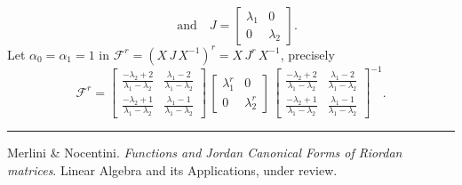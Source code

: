 \documentclass[9pt]{beamer}
\begin{document}
\begin{frame}[fragile]
\begin{displaymath}
\quad\text{and}\quad J = \left[\begin{matrix}\lambda_{1} & 0\\0 & \lambda_{2}\end{matrix}\right].
\end{displaymath}
Let $\alpha_{0} = \alpha_{1} = 1$ in
$\displaystyle \mathcal{F}^{r} = \left(X\,J\,X^{-1}\right)^{r} = X\,J^{r}\,X^{-1}$, precisely
$$\mathcal{F}^{r}=\left[\begin{matrix}\frac{- \lambda_{2} + 2}{\lambda_{1} - \lambda_{2}} & \frac{\lambda_{1} - 2}{\lambda_{1} - \lambda_{2}}\\\frac{- \lambda_{2} + 1}{\lambda_{1} - \lambda_{2}} & \frac{\lambda_{1} - 1}{\lambda_{1} - \lambda_{2}}\end{matrix}\right]\,\left[\begin{matrix}\lambda_{1}^{r} & 0\\0 & \lambda_{2}^{r}\end{matrix}\right]\,\left[\begin{matrix}\frac{- \lambda_{2} + 2}{\lambda_{1} - \lambda_{2}} & \frac{\lambda_{1} - 2}{\lambda_{1} - \lambda_{2}}\\\frac{- \lambda_{2} + 1}{\lambda_{1} - \lambda_{2}} & \frac{\lambda_{1} - 1}{\lambda_{1} - \lambda_{2}}\end{matrix}\right]^{-1}.$$
\vfill
\noindent\rule{\textwidth}{0.1pt}
{\footnotesize
Merlini \& Nocentini. \textit{Functions and Jordan Canonical Forms of Riordan
matrices}. \newline Linear Algebra and its Applications, under review.}
\end{frame}


\iffalse
\end{document}

